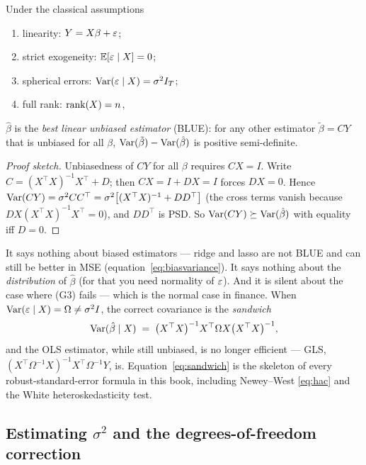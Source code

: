 \begin{theorem}
\label{thm:gaussmarkov}
Under the classical assumptions
\begin{enumerate}[label=(G\arabic*),leftmargin=*]
  \item linearity: $Y=X\beta+\varepsilon$;
  \item strict exogeneity: $\mathbb{E}[\varepsilon\mid X]=0$;
  \item spherical errors: $\operatorname{Var}(\varepsilon\mid X)=\sigma^2 I_T$;
  \item full rank: $\operatorname{rank}(X)=n$,
\end{enumerate}
$\hat\beta$ is the \emph{best linear unbiased estimator} (BLUE): for any other estimator
$\tilde\beta=CY$ that is unbiased for all $\beta$, $\operatorname{Var}(\tilde\beta)-\operatorname{Var}(\hat\beta)$ is
positive semi-definite.
\end{theorem}
\begin{proof}[Proof sketch]
Unbiasedness of $CY$ for all $\beta$ requires $CX=I$. Write $C=(X^{\top}X)^{-1}X^{\top}+D$;
then $CX=I+DX=I$ forces $DX=0$. Hence
$\operatorname{Var}(CY)=\sigma^2 CC^{\top}=\sigma^2\bigl[(X^{\top}X)^{-1}+DD^{\top}\bigr]$
(the cross terms vanish because $D X (X^{\top}X)^{-1}X^{\top}=0$), and $DD^{\top}$ is PSD.
So $\operatorname{Var}(CY)\succeq\operatorname{Var}(\hat\beta)$ with equality iff $D=0$.
\end{proof}

\begin{remark}
It says nothing about biased estimators --- ridge and lasso are not BLUE and can still be
better in MSE (equation~\eqref{eq:biasvariance}). It says nothing about the
\emph{distribution} of $\hat\beta$ (for that you need normality of $\varepsilon$). And it is
silent about the case where (G3) fails --- which is the normal case in finance. When
$\operatorname{Var}(\varepsilon\mid X)=\Omega\ne\sigma^2I$, the correct covariance is the \emph{sandwich}
\begin{equation}
  \operatorname{Var}(\hat\beta\mid X) \;=\; \bigl(X^{\top}X\bigr)^{-1}X^{\top}\Omega X\bigl(X^{\top}X\bigr)^{-1},
  \label{eq:sandwich}
\end{equation}
and the OLS estimator, while still unbiased, is no longer efficient --- GLS,
$(X^{\top}\Omega^{-1}X)^{-1}X^{\top}\Omega^{-1}Y$, is. Equation~\eqref{eq:sandwich} is
the skeleton of every robust-standard-error formula in this book, including
Newey--West \eqref{eq:hac} and the White heteroskedasticity test.
\end{remark}

\subsection{Estimating $\sigma^2$ and the degrees-of-freedom correction}
\label{sec:ols:sigma2}

